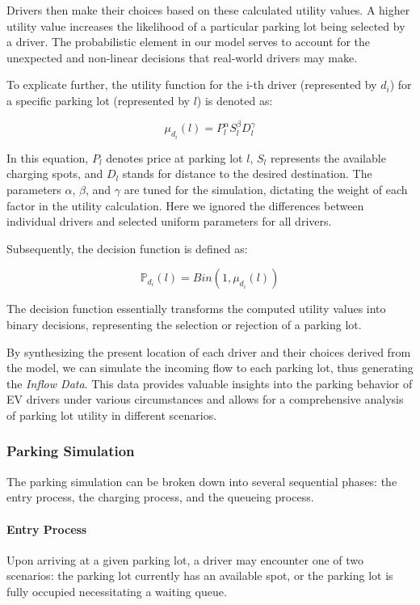 Drivers then make their choices based on these calculated utility values. A higher utility value increases the likelihood of a particular parking lot being selected by a driver. The probabilistic element in our model serves to account for the unexpected and non-linear decisions that real-world drivers may make. 

To explicate further, the utility function for the i-th driver (represented by \(d_i\)) for a specific parking lot (represented by \(l\)) is denoted as:

\[
\mu_{d_i}(l) = P_l^{\alpha} S_l^{\beta} D_l^{\gamma}
\]

In this equation, \(P_l\) denotes price at parking lot $l$, \(S_l\) represents the available charging spots, and \(D_l\) stands for distance to the desired destination. The parameters \(\alpha\), \(\beta\), and \(\gamma\) are tuned for the simulation, dictating the weight of each factor in the utility calculation. Here we ignored the differences between individual drivers and selected uniform parameters for all drivers.

Subsequently, the decision function is defined as:

\[
\mathbb{P}_{d_i}(l) = Bin(1, \mu_{d_i}(l))
\]

The decision function essentially transforms the computed utility values into binary decisions, representing the selection or rejection of a parking lot.

By synthesizing the present location of each driver and their choices derived from the model, we can simulate the incoming flow to each parking lot, thus generating the \emph{Inflow Data}. This data provides valuable insights into the parking behavior of EV drivers under various circumstances and allows for a comprehensive analysis of parking lot utility in different scenarios.

\subsubsection{Parking Simulation}
The parking simulation can be broken down into several sequential phases: the entry process, the charging process, and the queueing process.

\paragraph{Entry Process}
Upon arriving at a given parking lot, a driver may encounter one of two scenarios: the parking lot currently has an available spot, or the parking lot is fully occupied necessitating a waiting queue.


